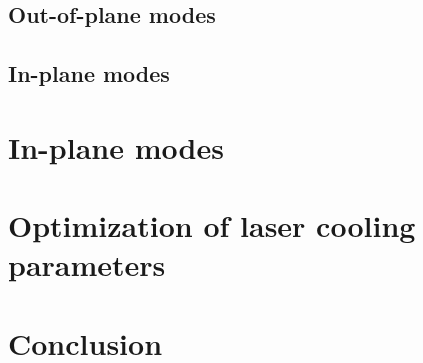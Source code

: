 \documentclass[aps, pra, twocolumn]{revtex4-1}
\begin{document}
\subsection{Out-of-plane modes}

\subsection{In-plane modes}


\section{In-plane modes}
\label{sec:inplanemodes}


\section{Optimization of laser cooling parameters}
\label{sec:optimization}


\section{Conclusion}
\label{sec:conclusion}


\end{document}
